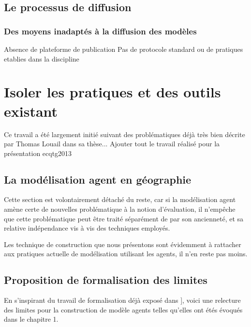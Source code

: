 \subsection{Le processus de diffusion}
\subsubsection{Des moyens inadaptés à la diffusion des modèles}
Absence de plateforme de publication
Pas de protocole standard ou de pratiques etablies dans la discipline

\section {Isoler les pratiques et des outils existant} 

Ce travail a été largement initié suivant des problématiques déjà très bien décrite par Thomas Louail dans sa thèse...
Ajouter tout le travail réalisé pour la présentation ecqtg2013

\subsection {La modélisation agent en géographie} 

Cette section est volontairement détaché du reste, car si la modélisation agent amène certe de nouvelles problématique à la notion d'évaluation, il n'empêche que cette problématique peut être traité séparément de par son ancienneté, et sa relative indépendance vis à vis des techniques employés.

Les technique de construction que nous présentons sont évidemment à rattacher aux pratiques actuelle de modélisation utilisant les agents, il n'en reste pas moins.


\subsection{Proposition de formalisation des limites} 

En s'inspirant du travail de formalisation déjà exposé dans \autocite[120]{Louail2010}], voici une relecture des limites pour la construction de modèle agents telles qu'elles ont étés évoqués dans le chapitre 1.


